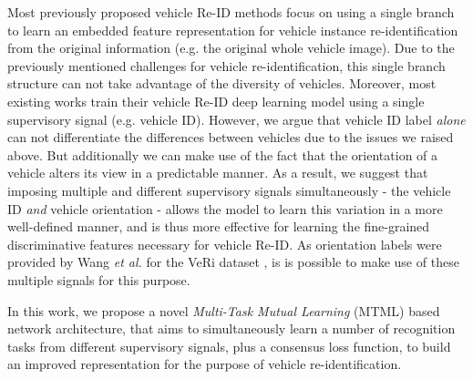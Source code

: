 \documentclass[10pt,twocolumn,letterpaper]{article}
\def\etal{\emph{et al.\hspace{0.3em}}}
\begin{document}
Most previously proposed vehicle Re-ID methods \cite{liu2016vehicleid,liu2016veri,Shen_2017_ICCV,Zhou2018VAMI} focus on using a single branch
to learn an embedded feature representation for vehicle instance re-identification
from the original information (e.g. the original whole vehicle image).
%
Due to the previously mentioned challenges for vehicle re-identification,
this single branch structure can not take advantage of the diversity of vehicles.
%
Moreover, most existing works
\cite{liu2016vehicleid,liu2016veri}
train their vehicle Re-ID deep learning model
using a single supervisory signal (e.g. vehicle ID).
%
However, we argue that vehicle ID label {\em alone} can not differentiate the differences between vehicles due to the issues we raised above. But additionally we can make use of the fact that the orientation of a vehicle alters its view in a predictable manner.
As a result, we suggest that imposing multiple and different supervisory signals
simultaneously - the vehicle ID \emph{and} vehicle orientation - allows the model to learn this variation in a more well-defined manner, and is thus more effective
for learning the fine-grained discriminative features necessary for vehicle
Re-ID. As orientation labels were provided by Wang \etal \cite{Wang_2017_ICCV} for the VeRi dataset \cite{liu2016veri}, is is possible to make use of these multiple signals for this purpose.



In this work, we propose a novel {\em Multi-Task Mutual Learning}
(MTML) based network architecture,
that aims to simultaneously learn a number of recognition tasks from
different supervisory signals, plus a consensus loss function, to
build an improved representation for the purpose of vehicle
re-identification.
\end{document}
